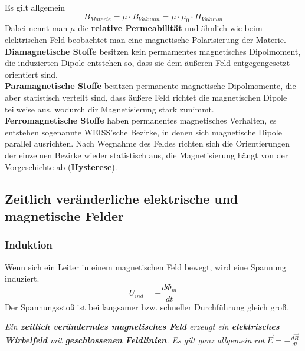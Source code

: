 \documentclass[12pt,a4paper,ngerman]{article}
\begin{document}
Es gilt allgemein
\begin{equation}
B_{Materie} = \mu \cdot B_{Vakuum} = \mu \cdot \mu_0 \cdot H_{Vakuum}
\end{equation}
Dabei nennt man $\mu$ die \textbf{relative Permeabilität} und ähnlich wie beim elektrischen Feld beobachtet man eine magnetische Polarisierung der Materie. \\
\textbf{Diamagnetische Stoffe} besitzen kein permamentes magnetisches Dipolmoment, die induzierten Dipole entstehen so, dass sie dem äußeren Feld entgegengesetzt orientiert sind. \\
\textbf{Paramagnetische Stoffe} besitzen permanente magnetische Dipolmomente, die aber statistisch verteilt sind, dass äußere Feld richtet die magnetischen Dipole teilweise aus, wodurch dir Magnetisierung stark zunimmt. 
\\
\textbf{Ferromagnetische Stoffe} haben permanentes magnetisches Verhalten, es entstehen sogenannte WEISS'sche Bezirke, in denen sich magnetische Dipole parallel ausrichten. Nach Wegnahme des Feldes richten sich die Orientierungen der einzelnen Bezirke wieder statistisch aus, die Magnetisierung hängt von der Vorgeschichte ab (\textbf{Hysterese}).

\pagebreak 

\subsection{Zeitlich veränderliche elektrische und magnetische Felder}
\subsubsection*{Induktion}
Wenn sich ein Leiter in einem magnetischen Feld bewegt, wird eine Spannung induziert. \begin{equation}
U_{ind} = -\frac{d\Phi_m}{dt}
\end{equation}
Der Spannungsstoß ist bei langsamer bzw. schneller Durchführung gleich groß.
\begin{center}
\textit{Ein \textbf{zeitlich veränderndes magnetisches Feld} erzeugt ein \textbf{elektrisches Wirbelfeld} mit \textbf{geschlossenen Feldlinien}. Es gilt ganz allgemein $rot \ \vec{E} = -\frac{d\vec{B}}{dt}$}
\end{center}
\end{document}
